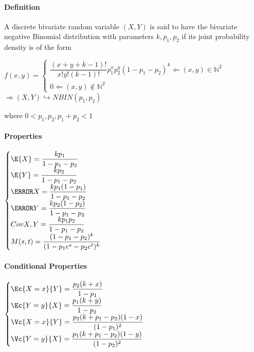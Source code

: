 \paragraph{Definition}
A discrete bivariate random variable $(X, Y )$ is said to have
the bivariate negative Binomial distribution with parameters $k, p_{1}, p_{2}$ if its joint probability density is of the
form
\begin{center}
	$f(x,y)=
	\begin{cases}	
		\dfrac{(x+y+k-1)!}{x!y!(k-1)!}p_{1}^{x}p_{2}^{y}(1-p_{1}-p_{2})^{k}\Leftarrow (x,y)\in\mathbb{N}^{2}\\
		0\Leftarrow (x,y)\not\in\mathbb{N}^{2} 
	\end{cases}$	
	$\Rightarrow \left( X,Y \right)\hookrightarrow NBIN(p_{1},p_{2})
	$
\end{center}
where $0<p_{1},p_{2}, p_{1}+p_{2}<1$
\paragraph{Properties}
\begin{center}
	$
	\begin{cases}
		\E{X}=\dfrac{kp_{1}}{1-p_{1}-p_{2}}\\
	\E{Y}=\dfrac{kp_{2}}{1-p_{1}-p_{2}}\\
	\V{X}=\dfrac{kp_{1}(1-p_{1})}{1-p_{1}-p_{2}}\\
	\V{Y}=\dfrac{kp_{2}(1-p_{2})}{1-p_{1}-p_{2}}\\
	Cov{X,Y}=\dfrac{kp_{1}p_{2}}{1-p_{1}-p_{2}}\\
	M(s,t)=\dfrac{(1-p_{1}-p_{2})^{k}}{(1-p_{1}e^{s}-p_{2}e^{t})^{k}}
	\end{cases}
	$
\end{center}
\paragraph{Conditional Properties}
\begin{center}
	$
	\begin{cases}
	\Ec{X=x}{Y}=\dfrac{p_{2}(k+x)}{1-p_{1}}\\
	\Ec{Y=y}{X}=\dfrac{p_{1}(k+y)}{1-p_{2}}\\
	\Vc{X=x}{Y}=\dfrac{p_{2}(k+p_{1}-p_{2})(1-x)}{(1-p_{1})^{2}}\\
	\Vc{Y=y}{X}=\dfrac{p_{1}(k+p_{1}-p_{2})(1-y)}{(1-p_{2})^{2}}
	\end{cases}
	$
\end{center}
